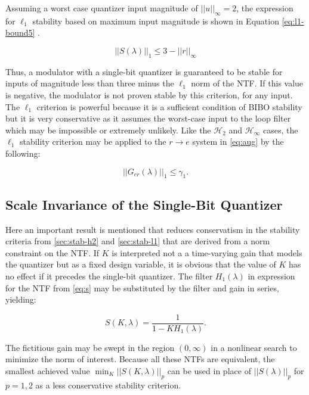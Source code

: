 Assuming a worst case quantizer input magnitude of $||u||_\infty = 2$, the expression for $\ell_1$ stability based on maximum input magnitude is shown in Equation \ref{eq:l1-bound5} \cite{Anastassiou1989}.

\begin{equation} 
	 ||S(\lambda)||_1 \leq 3 - ||r||_\infty \label{eq:l1-bound5}
\end{equation}

Thus, a modulator with a single-bit quantizer is guaranteed to be stable for inputs of magnitude less than three minus the $\ell_1$ norm of the NTF. If this value is negative, the modulator is not proven stable by this criterion, for any input. The $\ell_1$ criterion is powerful because it is a sufficient condition of \gls{BIBO} stability but it is very conservative as it assumes the worst-case input to the loop filter which may be impossible or extremely unlikely. Like the $\mathcal{H}_2$ and $\mathcal{H}_\infty$ cases, the $\ell_1$ stability criterion may be applied to the $r \rightarrow e$ system in \autoref{eq:aug} by the following:

\begin{equation}
	||G_{er}(\lambda)||_1 \leq \gamma_1. \label{eq:l1}
\end{equation}

\subsection{Scale Invariance of the Single-Bit Quantizer}

Here an important result is mentioned that reduces conservatism in the stability criteria from \autoref{sec:stab-h2} and \autoref{sec:stab-l1} that are derived from a norm constraint on the \gls{NTF}. If $K$ is interpreted not a a time-varying gain that models the quantizer but as a fixed design variable, it is obvious that the value of $K$ has no effect if it precedes the single-bit quantizer. The filter $H_1(\lambda)$ in expression for the \gls{NTF} from \autoref{eq:s} may be substituted by the filter and gain in series, yielding:

\begin{equation}
	S(K, \lambda) = \frac{1}{1 - KH_1(\lambda)}. \label{eq:scale-invariance}
\end{equation}

The fictitious gain may be swept in the region $(0, \infty)$ in a nonlinear search to minimize the norm of interest. Because all these \gls{NTF}s are equivalent, the smallest achieved value $\min_K ||S(K, \lambda)||_p$ can be used in place of $||S(\lambda)||_p$ for $p = 1, 2$ as a less conservative stability criterion.

